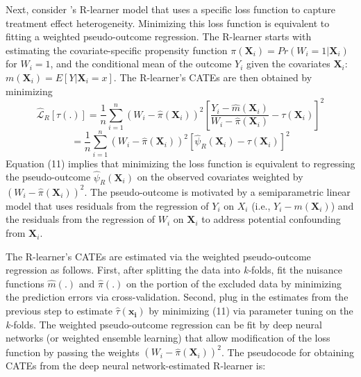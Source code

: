 Next, consider \citet{nie2021quasi}'s R-learner model that
uses a specific loss function to capture treatment effect heterogeneity.
Minimizing this loss function is equivalent to fitting a weighted
pseudo-outcome regression. The R-learner starts with estimating the
covariate-specific propensity function
\(\pi\left(\mathbf{X}_{i}\right)=Pr(W_{i}=1|\mathbf{X}_{i})\) for
\(W_{i}=1\), and the conditional mean of the outcome \(Y_{i}\) given the
covariates \(\mathbf{X}_{i}\):
\(m\left(\mathbf{X}_{i}\right)=E\left[Y|\mathbf{X}_{i} = x\right]\). The
R-learner's CATEs are then obtained by minimizing \begin{equation}
\widehat{\mathcal{L}}_{R}\left[\tau\left(.\right)\right]=\frac{1}{n}\sum_{i=1}^{n}(W_{i}-\widehat{\pi}\left(\mathbf{X}_{i}\right))^{2}\left[\frac{Y_{i}-\widehat{m}\left(\mathbf{X}_{i}\right)}{W_{i}-\widehat{\pi}\left(\mathbf{X}_{i}\right)}-\tau\left(\mathbf{X}_{i}\right)\right]^{2}
\end{equation} \begin{equation}
=\frac{1}{n}\sum_{i=1}^{n}\left(W_{i}-\widehat{\pi}\left(\mathbf{X}_{i}\right)\right)^{2}\left[\widehat{\psi}_{R}\left(\mathbf{X}_{i}\right)-\tau \left(\mathbf{X}_{i}\right)\right]^{2}         
\end{equation} Equation (11) implies that minimizing the loss function
is equivalent to regressing the pseudo-outcome
\(\widehat{\psi}_{R}\left(\mathbf{X}_{i}\right)\) on the observed
covariates weighted by
\((W_{i}-\widehat{\pi}\left(\mathbf{X}_{i}\right))^{2}\). The
pseudo-outcome is motivated by a semiparametric linear model that uses
residuals from the regression of \(Y_{i}\) on \(X_{i}\) (i.e.,
\(Y_{i}-m\left(\mathbf{X}_{i}\right)\)) and the residuals from the
regression of \(W_{i}\) on \(\mathbf{X}_{i}\) to address potential
confounding from \(\mathbf{X}_{i}\).

The R-learner's CATEs are estimated via the weighted pseudo-outcome
regression as follows. First, after splitting the data into \emph{k-}folds,
fit the nuisance functions \(\widehat{m}\left(.\right)\) and
\(\widehat{\pi}\left(.\right)\) on the portion of the excluded data by
minimizing the prediction errors via cross-validation. Second, plug in
the estimates from the previous step to estimate
\(\hat{\tau}(\mathbf{x_{i}})\) by minimizing (11) via parameter tuning on
the \emph{k-}folds. The weighted pseudo-outcome regression can be fit by deep
neural networks (or weighted ensemble learning) that allow modification
of the loss function by passing the weights
\((W_{i}-\widehat{\pi}\left(\mathbf{X}_{i}\right))^{2}\). The pseudocode
for obtaining CATEs from the deep neural network-estimated R-learner is:

